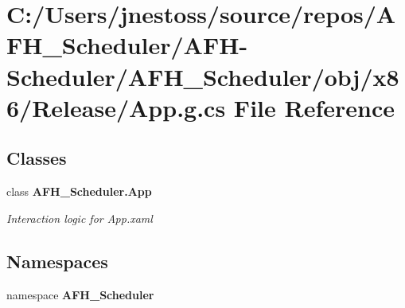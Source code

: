 \section{C\+:/\+Users/jnestoss/source/repos/\+A\+F\+H\+\_\+\+Scheduler/\+A\+F\+H-\/\+Scheduler/\+A\+F\+H\+\_\+\+Scheduler/obj/x86/\+Release/\+App.g.\+cs File Reference}
\label{x86_2_release_2_app_8g_8cs}
\subsection*{Classes}
\begin{DoxyCompactItemize}
\item 
class \textbf{ A\+F\+H\+\_\+\+Scheduler.\+App}
\begin{DoxyCompactList}\small\item\em Interaction logic for App.\+xaml \end{DoxyCompactList}\end{DoxyCompactItemize}
\subsection*{Namespaces}
\begin{DoxyCompactItemize}
\item 
namespace \textbf{ A\+F\+H\+\_\+\+Scheduler}
\end{DoxyCompactItemize}
